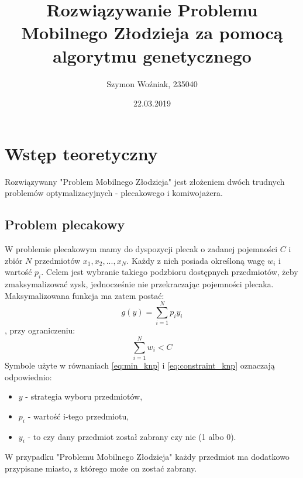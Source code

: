 \documentclass{article}
\author{Szymon Woźniak, 235040}
\date{22.03.2019}
\title{Rozwiązywanie Problemu Mobilnego Złodzieja za pomocą algorytmu genetycznego}
\begin{document}
	\maketitle
	\newpage
	
	\section{Wstęp teoretyczny}
	Rozwiązywany "Problem Mobilnego Złodzieja" jest złożeniem dwóch trudnych problemów optymalizacyjnych - plecakowego i komiwojażera.
	\subsection{Problem plecakowy}
	W problemie plecakowym mamy do dyspozycji plecak o zadanej pojemności $C$ i zbiór $N$ przedmiotów ${x_{1}, x_{2}, ..., x_{N}}$. Każdy z nich posiada określoną wagę $w_{i}$ i wartość $p_{i}$. Celem jest wybranie takiego podzbioru dostępnych przedmiotów, żeby zmaksymalizować zysk, jednocześnie nie przekraczając pojemności plecaka. Maksymalizowana funkcja ma zatem postać:
	\begin{equation}\label{eq:min_knp}
		g(y) = \sum\limits_{i=1}^{N} p_{i}y_{i}
	\end{equation}
	, przy ograniczeniu:
	\begin{equation}\label{eq:constraint_knp}
		\sum\limits_{i=1}^{N} w_{i} < C
	\end{equation}
	Symbole użyte w równaniach \ref{eq:min_knp} i \ref{eq:constraint_knp} oznaczają odpowiednio:
	\begin{itemize}
		\item $y$ - strategia wyboru przedmiotów,
		\item $p_{i}$ - wartość i-tego przedmiotu,
		\item $y_{i}$ - to czy dany przedmiot został zabrany czy nie (1 albo 0).
	\end{itemize}
	W przypadku "Problemu Mobilnego Złodzieja" każdy przedmiot ma dodatkowo przypisane miasto, z którego może on zostać zabrany.
\end{document}
